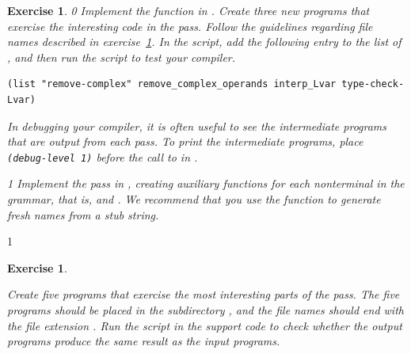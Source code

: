 \documentclass[7x10]{TimesAPriori_MIT}%
\def\racketEd{0}
\def\pythonEd{1}
\def\edition{1}
\newcommand{\pythonColor}[0]{}
\newtheorem{exercise}[theorem]{Exercise}
\numberwithin{theorem}{chapter}
\numberwithin{definition}{chapter}
\numberwithin{equation}{chapter}
\begin{document}
\begin{exercise}
  \normalfont\normalsize
{\if\edition\racketEd  
Implement the  function in
.
%
Create three new \LangVar{} programs that exercise the interesting
code in the  pass.  Follow the guidelines
regarding file names described in exercise~\ref{ex:Lvar}.
%
In the  script, add the following entry to the
list of , and then run the script to test your compiler.
\begin{lstlisting}
(list "remove-complex" remove_complex_operands interp_Lvar type-check-Lvar)
\end{lstlisting}
In debugging your compiler, it is often useful to see the intermediate
programs that are output from each pass. To print the intermediate
programs, place \lstinline{(debug-level 1)} before the call to
 in .  \fi}
%
{\if\edition\pythonEd\pythonColor
  Implement the  pass in
  , creating auxiliary functions for each
  nonterminal in the grammar, that is, 
  and . We recommend that you use the function
   to generate fresh names from a stub string.
\fi}  
\end{exercise}

{\if\edition\pythonEd\pythonColor
\begin{exercise}
\normalfont\normalsize
\label{ex:Lvar}

Create five \LangVar{} programs that exercise the most interesting
parts of the  pass.  The five programs
should be placed in the subdirectory , and the file
names should end with the file extension .  Run the
 script in the support code to check whether the
output programs produce the same result as the input programs.
\end{exercise}

\fi}
\end{document}

